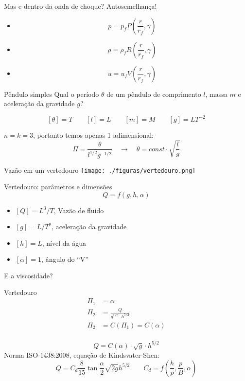 \documentclass{beamer}
\newcommand{\lra}{\ensuremath{\longrightarrow}}
\newcommand{\qrq}{\ensuremath{\quad\lra\quad}}
\begin{document}
\begin{frame}{Mas e dentro da onda de choque?}
  Autosemelhança!
  \begin{itemize}
  \item \[ p = p_f P\left(\frac{r}{r_f}, \gamma\right) \]
  \item \[ \rho = \rho_f R\left(\frac{r}{r_f}, \gamma\right) \]
  \item \[ u = u_f V\left(\frac{r}{r_f}, \gamma\right) \]
\end{itemize}
\end{frame}


\begin{frame}{Pêndulo simples}
  Qual o período $\theta$ de um pêndulo de comprimento $l$, massa $m$ e aceleração da gravidade $g$?

  \[
    [\theta] = T \qquad [l] = L \qquad [m] = M \qquad [g] = LT^{-2}
  \]

  $n=k=3$, portanto temos apenas 1 adimensional:
  \[
  \Pi = \frac{\theta}{l^{1/2}g^{-1/2}} \qrq \theta = const \cdot \sqrt{\frac{l}{g}}
  \]
  
  
\end{frame}

\begin{frame}{Vazão em um vertedouro}
  \centering
  \texttt{[image: ./figuras/vertedouro.png]}
\end{frame}

\begin{frame}{Vertedouro: parâmetros e dimensões}
  \[
  Q = f(g,h,\alpha)
  \]
  \begin{itemize}
  \item $[Q] = L^3/T$, Vazão de fluido
  \item $[g] = L/T^2$, aceleração da gravidade
  \item $[h] = L$, nível da água
  \item $[\alpha] = 1$, ângulo do ``V''
  \end{itemize}

  E a viscosidade?
\end{frame}

\begin{frame}{Vertedouro}
  \[
  \begin{aligned}
    \Pi_1 &= \alpha\\
    \Pi_2 &= \frac{Q}{g^{1/2}\cdot h^{5/2}}\\
    \Pi_2 &= C(\Pi_1) = C(\alpha)\\
  \end{aligned}
  \]

  \[
  Q = C(\alpha)\cdot \sqrt{g} \cdot h^{5/2}
  \]
  Norma ISO-1438:2008, equação de Kindsvater-Shen:
  \[
  Q = C_d\frac{8}{15}\tan\frac{\alpha}{2}\sqrt{2g}h^{5/2} \qquad C_d = f\left(\frac{h}{p}, \frac{p}{B}, \alpha\right)
  \]
  
  
\end{frame}
\end{document}
